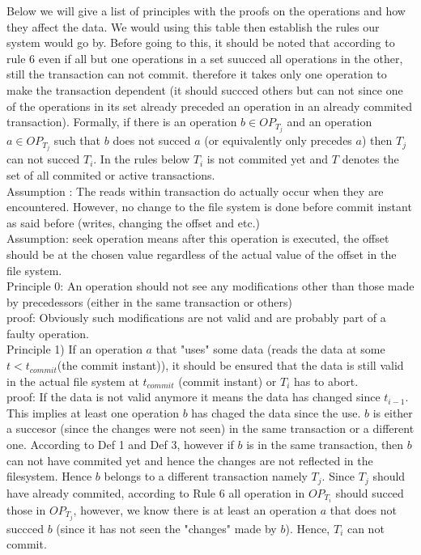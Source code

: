 \documentclass[a4paper, 11pt]{article}
\begin{document}
Below we will give a list of principles with the proofs on the operations and how they affect the data. We would using this table then establish the rules our system would go by. Before going to this, it should be noted that according to rule 6 even if all but one operations in a set suucced all operations in the other, still the transaction can not commit. therefore it takes only one operation to make the transaction dependent (it should succced others but can not since one of the operations in its set already preceded an operation in an already commited transaction). Formally, if there is an operation $b \in OP_{T_j}$ and an operation $a \in OP_{T_j}$ such that $b$ does not succed $a$ (or equivalently only precedes $a$) then $T_j$ can not succed $T_i$. In the rules below $T_i$ is not commited yet and $T$ denotes the set of all commited or active transactions. \\

Assumption : The reads within transaction do actually occur when they are encountered. However, no change to the file system is done before commit instant as said before (writes, changing the offset and etc.)\\


Assumption: seek operation means after this operation is executed, the offset should be at the chosen value regardless of the actual value of the offset in the file system.\\

Principle 0: An operation should not see any modifications other than those made by precedessors (either in the same transaction or others)\\

proof: Obviously such modifications are not valid and are probably part of a faulty operation.\\


Principle 1) If an operation $a$ that "uses" some data (reads the data at some $t < t_{commit}$(the commit instant)), it should be ensured that the data is still valid in the actual file system at $t_{commit}$ (commit instant) or $T_i$ has to abort.\\

proof: If the data is not valid anymore it means the data has changed since $t_{i-1}$. This implies at least one operation $b$ has chaged the data since the use. $b$ is either a succesor (since the changes were not seen) in the same transaction or a different one. According to Def 1 and Def 3, however if $b$ is in the same transaction, then $b$ can not have commited yet and hence the changes are not reflected in the filesystem. Hence $b$ belongs to a different transaction namely $T_j$. Since $T_j$ should have already commited, according to Rule 6 all operation in $OP_{T_i}$ should succed those in $OP_{T_j}$, however, we know there is at least an operation $a$ that does not succced $b$ (since it has not seen the "changes" made by $b$). Hence, $T_i$ can not commit.\\
\end{document}
